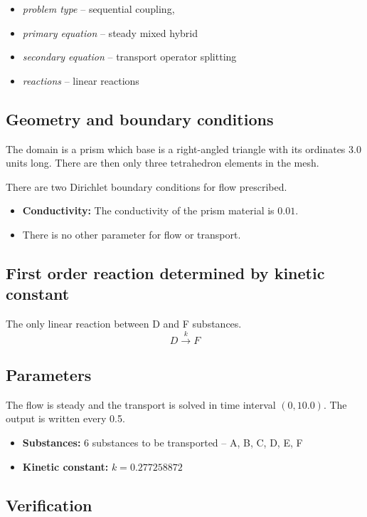 \begin{itemize} 
    \item \emph{problem type} -- sequential coupling, 
    \item \emph{primary equation} -- steady mixed hybrid
    \item \emph{secondary equation} -- transport operator splitting
    \item \emph{reactions} -- linear reactions
  \end{itemize}

\subsection*{Geometry and boundary conditions}
The domain is a prism which base is a right-angled triangle with its ordinates 3.0 units long. There are then only three tetrahedron elements in the mesh.

There are two Dirichlet boundary conditions for flow prescribed.

\begin{itemize}
  \item \textbf{Conductivity:} The conductivity of the prism material is $0.01$. 
  \item There is no other parameter for flow or transport.
\end{itemize}



\subsection{First order reaction determined by kinetic constant}
The only linear reaction between D and F substances.
\[
D\xrightarrow{k}F
\]

\subsection*{Parameters}
The flow is steady and the transport is solved in time interval $(0,10.0)$. The output is written every 0.5.  
\begin{itemize}
  \item \textbf{Substances:} 6 substances to be transported -- A, B, C, D, E, F
  \item \textbf{Kinetic constant:} $k = 0.277258872$
\end{itemize}

\subsection*{Verification}

